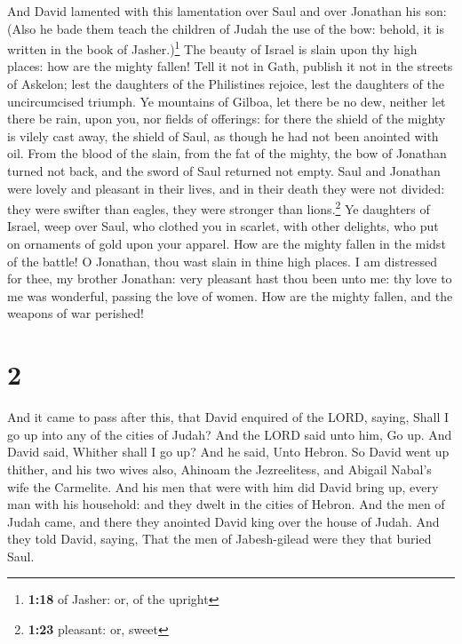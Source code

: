  And David lamented with this lamentation over Saul and
over Jonathan his son:  (Also he bade them teach the
children of Judah the use of the bow: behold, it is written in the book
of Jasher.)\footnote{\textbf{1:18} of Jasher: or, of the upright}
 The beauty of Israel is slain upon thy high places: how
are the mighty fallen!  Tell it not in Gath, publish it
not in the streets of Askelon; lest the daughters of the Philistines
rejoice, lest the daughters of the uncircumcised triumph.
 Ye mountains of Gilboa, let there be no dew, neither let
there be rain, upon you, nor fields of offerings: for there the shield
of the mighty is vilely cast away, the shield of Saul, as though he had
not been anointed with oil.  From the blood of the slain,
from the fat of the mighty, the bow of Jonathan turned not back, and the
sword of Saul returned not empty.  Saul and Jonathan were
lovely and pleasant in their lives, and in their death they were not
divided: they were swifter than eagles, they were stronger than
lions.\footnote{\textbf{1:23} pleasant: or, sweet}  Ye
daughters of Israel, weep over Saul, who clothed you in scarlet, with
other delights, who put on ornaments of gold upon your apparel.
 How are the mighty fallen in the midst of the battle! O
Jonathan, thou wast slain in thine high places.  I am
distressed for thee, my brother Jonathan: very pleasant hast thou been
unto me: thy love to me was wonderful, passing the love of women.
 How are the mighty fallen, and the weapons of war
perished!

\hypertarget{section-1}{%
\section{2}\label{section-1}}

 And it came to pass after this, that David enquired of
the LORD, saying, Shall I go up into any of the cities of Judah? And the
LORD said unto him, Go up. And David said, Whither shall I go up? And he
said, Unto Hebron.  So David went up thither, and his two
wives also, Ahinoam the Jezreelitess, and Abigail Nabal's wife the
Carmelite.  And his men that were with him did David bring
up, every man with his household: and they dwelt in the cities of
Hebron.  And the men of Judah came, and there they
anointed David king over the house of Judah. And they told David,
saying, That the men of Jabesh-gilead were they that buried Saul.

